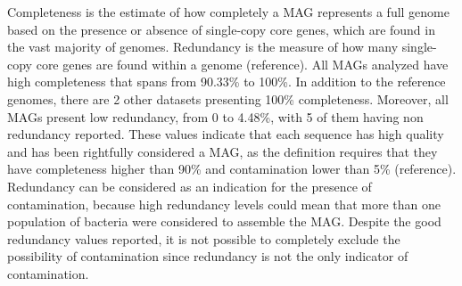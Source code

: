 Completeness is the estimate of how completely a MAG represents a full genome based on the presence or absence of single-copy core genes, which are found in the vast majority of genomes. Redundancy is the measure of how many single-copy core genes are found within a genome (reference). All MAGs analyzed have high completeness that spans from 90.33\% to 100\%. In addition to the reference genomes, there are 2 other datasets presenting 100\% completeness. Moreover, all MAGs present low redundancy, from 0 to 4.48\%, with 5 of them having non redundancy reported. These values indicate that each sequence has high quality and has been rightfully considered a MAG, as the definition requires that they have completeness higher than 90\% and contamination lower than 5\% (reference). Redundancy can be considered as an indication for the presence of contamination, because high redundancy levels could mean that more than one population of bacteria were considered to assemble the MAG. Despite the good redundancy values reported, it is not possible to completely exclude the possibility of contamination since redundancy is not the only indicator of contamination.




































































